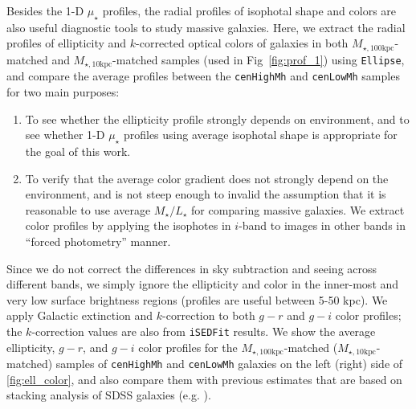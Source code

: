 \documentclass[a4paper,fleqn,usenatbib]{mnras}
\def\rbcg{\texttt{cenHighMh}}
\def\nbcg{\texttt{cenLowMh}}
\def\minn{{$M_{\star,10\mathrm{kpc}}$}}
\def\mtot{{$M_{\star,100\mathrm{kpc}}$}}
\def\m2l{{$M_{\star}/L_{\star}$}}
\def\mden{{$\mu_{\star}$}}
\begin{document}
    Besides the 1-D \mden{} profiles, the radial profiles of isophotal shape and colors 
    are also useful diagnostic tools to study massive galaxies. 
    Here, we extract the radial profiles of ellipticity and $k$-corrected optical colors
    of galaxies in both \mtot{}-matched and \minn{}-matched samples (used in 
    Fig~\ref{fig:prof_1}) using \texttt{Ellipse}, and compare the average profiles between
    the \rbcg{} and \nbcg{} samples for two main purposes:
    
    \begin{enumerate}
        \item To see whether the ellipticity profile strongly depends on environment, 
            and to see whether 1-D \mden{} profiles using average isophotal shape is 
            appropriate for the goal of this work.
        
        \item To verify that the average color gradient does not strongly depend on 
            the environment, and is not steep enough to invalid the assumption that   
            it is reasonable to use average \m2l for comparing massive galaxies. 
            We extract color profiles by applying the isophotes in $i$-band to images 
            in other bands in ``forced photometry'' manner.  
    \end{enumerate}

    Since we do not correct the differences in sky subtraction and seeing across 
    different bands, we simply ignore the ellipticity and color in the inner-most and 
    very low surface brightness regions (profiles are useful between 5-50 kpc). 
    We apply Galactic extinction and $k$-correction to both $g-r$ and $g-i$ color 
    profiles; the $k$-correction values are also from \texttt{iSEDFit} results.
    We show the average ellipticity, $g-r$, and $g-i$ color profiles for the 
    \mtot{}-matched (\minn{}-matched) samples of \rbcg{} and \nbcg{} galaxies on the 
    left (right) side of \ref{fig:ell_color}, and also compare them with previous 
    estimates that are based on stacking analysis of SDSS galaxies 
    (e.g. \citealt{LaBarbera2010, Tal2011, DSouza2014}).
\end{document}

